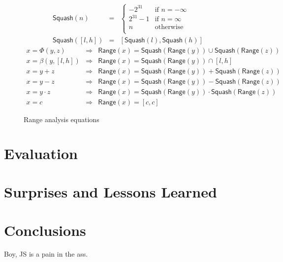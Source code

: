 \documentclass{article}
\newcommand{\Squash}{\mathsf{Squash}}
\newcommand{\Range}{\mathsf{Range}}
\let\x\cdot
\begin{document}
\begin{figure}[ht]
\begin{eqnarray*}
\Squash(n) &=& \begin{cases}
 -2^{31} &\text{if } n = -\infty \\
2^{31}-1 &\text{if } n = \infty \\
n&\text{otherwise } \\
\end{cases}\\
\Squash([l, h]) &=& [\Squash(l), \Squash(h)]
\end{eqnarray*}
%
\begin{eqnarray*}
x = \Phi(y, z) &\Rightarrow&
    \Range(x) = \Squash(\Range(y)) \cup \Squash(\Range(z)) \\
x = \beta(y, [l, h]) &\Rightarrow& \Range(x) = \Squash(\Range(y)) \cap [l, h] \\
x = y + z &\Rightarrow& \Range(x) = \Squash(\Range(y)) + \Squash(\Range(z)) \\
x = y - z &\Rightarrow& \Range(x) = \Squash(\Range(y)) - \Squash(\Range(z)) \\
x = y \x z &\Rightarrow& \Range(x) = \Squash(\Range(y)) \x \Squash(\Range(z)) \\
x = c &\Rightarrow& \Range(x) = [c, c]
\end{eqnarray*}
\caption{Range analysis equations}
\label{fig:range_anal}
\end{figure}


\section{Evaluation}

\section{Surprises and Lessons Learned}

\section{Conclusions}
Boy, JS is a pain in the ass.

{}

\end{document}
